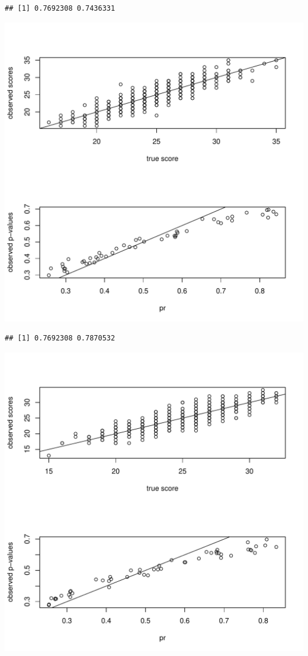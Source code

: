 \documentclass{article}\usepackage[]{graphicx}\usepackage[]{color}
\makeatletter
\def\maxwidth{ %
  \ifdim\Gin@nat@width>\linewidth
    \linewidth
  \else
    \Gin@nat@width
  \fi
}
\newenvironment{kframe}{%
 \def\at@end@of@kframe{}%
 \ifinner\ifhmode%
  \def\at@end@of@kframe{\end{minipage}}%
  \begin{minipage}{\columnwidth}%
 \fi\fi%
 \def\FrameCommand##1{\hskip\@totalleftmargin \hskip-\fboxsep
 \colorbox{shadecolor}{##1}\hskip-\fboxsep
     \hskip-\linewidth \hskip-\@totalleftmargin \hskip\columnwidth}%
 \MakeFramed {\advance\hsize-\width
   \@totalleftmargin\z@ \linewidth\hsize
   \@setminipage}}%
 {\par\unskip\endMakeFramed%
 \at@end@of@kframe}
\newenvironment{knitrout}{}{} %
\makeatother
\begin{document}
\begin{knitrout}
\begin{kframe}\begin{verbatim}
## [1] 0.7692308 0.7436331
\end{verbatim}
\end{kframe}
\includegraphics[width=\maxwidth]{figure/unnamed-chunk-2-8} 
\begin{kframe}\begin{verbatim}
## [1] 0.7692308 0.7870532
\end{verbatim}
\end{kframe}
\includegraphics[width=\maxwidth]{figure/unnamed-chunk-2-9} 

\end{knitrout}
\end{document}
